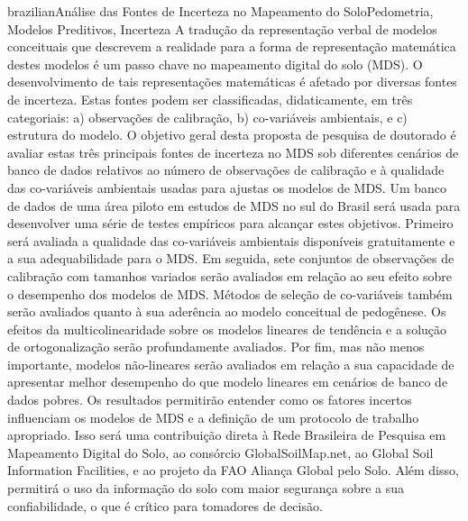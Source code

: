 \documentclass[tese]{UFRuralRJ}
\begin{document}

\def\tituloportugues{Análise das Fontes de Incerteza no Mapeamento do Solo}
\def\chavesportugues{Pedometria, Modelos Preditivos, Incerteza}
\generalabstracttrue
\begin{generalabstract}{brazilian}{\tituloportugues}{\chavesportugues}
A tradução da representação verbal de modelos conceituais que descrevem a 
realidade para a forma de representação matemática destes modelos é um passo 
chave no mapeamento digital do solo (MDS). O desenvolvimento de tais 
representações matemáticas é afetado por diversas fontes de incerteza. Estas 
fontes podem ser classificadas, didaticamente, em três categoriais: a) 
observações de calibração, b) co-variáveis ambientais, e c) estrutura do 
modelo. O objetivo geral desta proposta de pesquisa de doutorado é avaliar 
estas três principais fontes de incerteza no MDS sob diferentes cenários de 
banco de dados relativos ao número de observações de calibração e à qualidade 
das co-variáveis ambientais usadas para ajustas os modelos de MDS. Um banco de
dados de uma área piloto em estudos de MDS no sul do Brasil será usada para 
desenvolver uma série de testes empíricos para alcançar estes objetivos. 
Primeiro será avaliada a qualidade das co-variáveis ambientais disponíveis 
gratuitamente e a sua adequabilidade para o MDS. Em seguida, sete conjuntos 
de observações de calibração com tamanhos variados serão avaliados em relação 
ao seu efeito sobre o desempenho dos modelos de MDS. Métodos de seleção de 
co-variáveis também serão avaliados quanto à sua aderência ao modelo conceitual
de pedogênese. Os efeitos da multicolinearidade sobre os modelos lineares de 
tendência e a solução de ortogonalização serão profundamente avaliados. Por 
fim, mas não menos importante, modelos não-lineares serão avaliados em relação 
a sua capacidade de apresentar melhor desempenho do que modelo lineares em 
cenários de banco de dados pobres. Os resultados permitirão entender como os 
fatores incertos influenciam os modelos de MDS e a definição de um protocolo 
de trabalho apropriado. Isso será uma contribuição direta à Rede Brasileira de 
Pesquisa em Mapeamento Digital do Solo, ao consórcio GlobalSoilMap.net, ao 
Global Soil Information Facilities, e ao projeto da FAO Aliança Global pelo 
Solo. Além disso, permitirá o uso da informação do solo com maior segurança 
sobre a sua confiabilidade, o que é crítico para tomadores de decisão.
\end{generalabstract}
\end{document}
